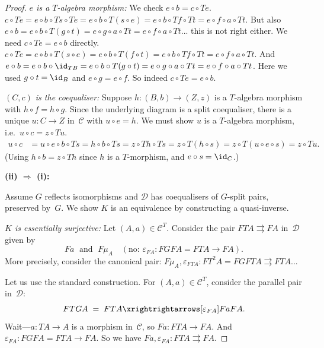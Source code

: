 \begin{proof}
\emph{$e$ is a $T$-algebra morphism:}
We check $e\circ b = c\circ Te$.
$c\circ Te = e\circ b\circ Ts\circ Te = e\circ b\circ T(s\circ e)
= e\circ b\circ Tf\circ Tt = e\circ f\circ a\circ Tt$.
But also $e\circ b = e\circ b\circ T(g\circ t) = e\circ g\circ a\circ Tt
= e\circ f\circ a\circ Tt$... this is not right either.
We need $c\circ Te = e\circ b$ directly.
$c\circ Te = e\circ b\circ T(s\circ e) = e\circ b\circ T(f\circ t)
= e\circ b\circ Tf\circ Tt = e\circ f\circ a\circ Tt$.
And $e\circ b = e\circ b\circ\id_{TB} = e\circ b\circ T(g\circ t)
= e\circ g\circ a\circ Tt = e\circ f\circ a\circ Tt$.
Here we used $g\circ t = \id_B$ and $e\circ g = e\circ f$.
So indeed $c\circ Te = e\circ b$.

\emph{$(C,c)$ is the coequaliser:}
Suppose $h\colon(B,b)\to(Z,z)$ is a $T$-algebra morphism with
$h\circ f = h\circ g$.  Since the underlying diagram is a split
coequaliser, there is a unique $u\colon C\to Z$ in~$\mathcal{C}$ with
$u\circ e = h$.  We must show $u$ is a $T$-algebra morphism, i.e.\
$u\circ c = z\circ Tu$.
\begin{align*}
    u\circ c &= u\circ e\circ b\circ Ts = h\circ b\circ Ts
    = z\circ Th\circ Ts = z\circ T(h\circ s)
    = z\circ T(u\circ e\circ s) = z\circ Tu.
\end{align*}
(Using $h\circ b = z\circ Th$ since $h$ is a $T$-morphism, and
$e\circ s = \id_C$.)

\medskip\noindent
\textbf{(ii) $\Rightarrow$ (i):}

Assume $G$ reflects isomorphisms and $\mathcal{D}$ has coequalisers
of $G$-split pairs, preserved by~$G$.  We show $K$ is an equivalence
by constructing a quasi-inverse.

\emph{$K$ is essentially surjective:}
Let $(A,a)\in\mathcal{C}^T$.  Consider the pair
$FTA \rightrightarrows FA$ in~$\mathcal{D}$ given by
\[
    Fa \;\text{ and }\; F\mu_A \quad (\text{no: }
    \varepsilon_{FA}\colon FGFA = FTA\to FA).
\]
More precisely, consider the canonical pair:
$F\mu_A, \varepsilon_{FTA}\colon FT^2A = FGFTA\rightrightarrows FTA$...

Let us use the standard construction.  For $(A,a)\in\mathcal{C}^T$,
consider the parallel pair in~$\mathcal{D}$:
\[
    FTGA \;=\; FTA \xrightrightarrows[\varepsilon_{FA}]{Fa} FA.
\]
Wait---$a\colon TA\to A$ is a morphism in~$\mathcal{C}$, so $Fa\colon FTA\to FA$.
And $\varepsilon_{FA}\colon FGFA = FTA\to FA$.  So we have
$Fa,\varepsilon_{FA}\colon FTA\rightrightarrows FA$.


\end{proof}

